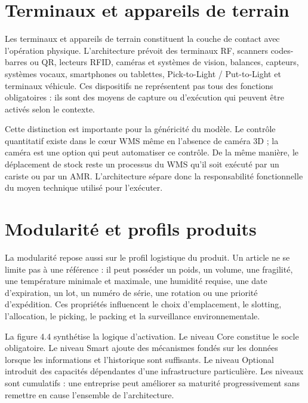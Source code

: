 
\section{Terminaux et appareils de terrain}

\label{sec:4.9}

Les terminaux et appareils de terrain constituent la couche de contact avec l’opération physique. L’architecture prévoit des terminaux RF, scanners codes-barres ou QR, lecteurs RFID, caméras et systèmes de vision, balances, capteurs, systèmes vocaux, smartphones ou tablettes, Pick-to-Light / Put-to-Light et terminaux véhicule. Ces dispositifs ne représentent pas tous des fonctions obligatoires : ils sont des moyens de capture ou d’exécution qui peuvent être activés selon le contexte.


Cette distinction est importante pour la généricité du modèle. Le contrôle quantitatif existe dans le cœur WMS même en l’absence de caméra 3D ; la caméra est une option qui peut automatiser ce contrôle. De la même manière, le déplacement de stock reste un processus du WMS qu’il soit exécuté par un cariste ou par un AMR. L’architecture sépare donc la responsabilité fonctionnelle du moyen technique utilisé pour l’exécuter.




\section{Modularité et profils produits}

\label{sec:4.10}

La modularité repose aussi sur le profil logistique du produit. Un article ne se limite pas à une référence : il peut posséder un poids, un volume, une fragilité, une température minimale et maximale, une humidité requise, une date d’expiration, un lot, un numéro de série, une rotation ou une priorité d’expédition. Ces propriétés influencent le choix d’emplacement, le slotting, l’allocation, le picking, le packing et la surveillance environnementale.


La figure 4.4 synthétise la logique d’activation. Le niveau Core constitue le socle obligatoire. Le niveau Smart ajoute des mécanismes fondés sur les données lorsque les informations et l’historique sont suffisants. Le niveau Optional introduit des capacités dépendantes d’une infrastructure particulière. Les niveaux sont cumulatifs : une entreprise peut améliorer sa maturité progressivement sans remettre en cause l’ensemble de l’architecture.


